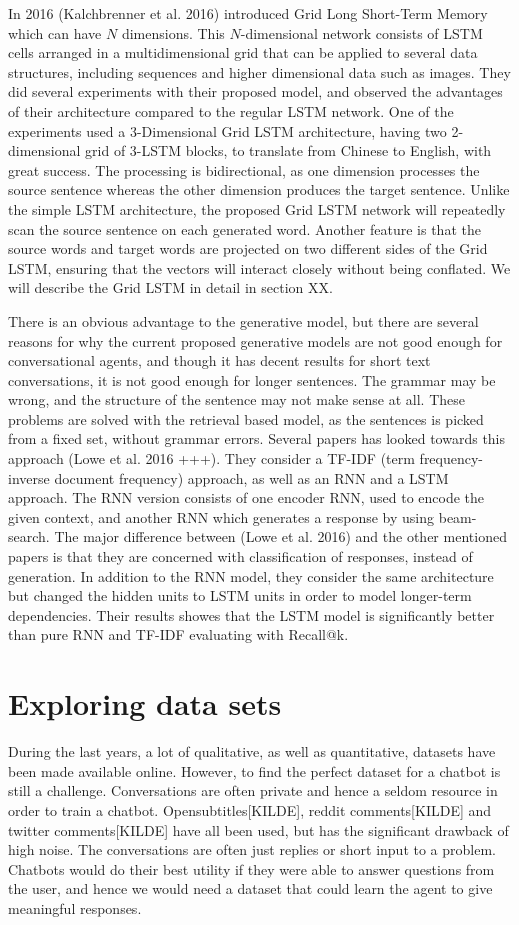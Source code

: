 \documentclass{article} %
\begin{document}
In 2016 (Kalchbrenner et al. 2016) introduced Grid Long Short-Term Memory which can have $N$ dimensions. This $N$-dimensional network consists of LSTM cells arranged in a multidimensional grid that can be applied to several data structures, including sequences and higher dimensional data such as images. They did several experiments with their proposed model, and observed the advantages of their architecture compared to the regular LSTM network. One of the experiments used a  3-Dimensional Grid LSTM architecture, having two 2-dimensional grid of 3-LSTM blocks, to translate from Chinese to English, with great success. The processing is bidirectional, as one dimension processes the source sentence whereas the other dimension produces the target sentence. Unlike the simple LSTM architecture, the proposed Grid LSTM network will repeatedly scan the source sentence on each generated word. Another feature is that the source words and target words are projected on two different sides of the Grid LSTM, ensuring that the vectors will interact closely without being conflated. We will describe the Grid LSTM in detail in section XX. 

There is an obvious advantage to the generative model, but there are several reasons for why the current proposed generative models are not good enough for conversational agents, and though it has decent results for short text conversations, it is not good enough for longer sentences. The grammar may be wrong, and the structure of the sentence may not make sense at all. These problems are solved with the retrieval based model, as the sentences is picked from a fixed set, without grammar errors. Several papers has looked towards this approach (Lowe et al. 2016 +++). They consider a TF-IDF (term frequency-inverse document frequency) approach, as well as an RNN and a LSTM approach. The RNN version consists of one encoder RNN, used to encode the given context, and another RNN which generates a response by using beam-search. The major difference between (Lowe et al. 2016) and the other mentioned papers is that they are concerned with classification of responses, instead of generation. In addition to the RNN model, they consider the same architecture but changed the hidden units to LSTM units in order to model longer-term dependencies. Their results showes that the LSTM model is significantly better than pure RNN and TF-IDF evaluating with Recall@k.

\section{Exploring data sets}
During the last years, a lot of qualitative, as well as quantitative, datasets have been made available online. However, to find the perfect dataset for a chatbot is still a challenge. Conversations are often private and hence a seldom resource in order to train a chatbot. Opensubtitles[KILDE], reddit comments[KILDE] and twitter comments[KILDE] have all been used, but has the significant drawback of high noise. The conversations are often just replies or short input to a problem. Chatbots would do their best utility if they were able to answer questions from the user, and hence we would need a dataset that could learn the agent to give meaningful responses.
\end{document}

